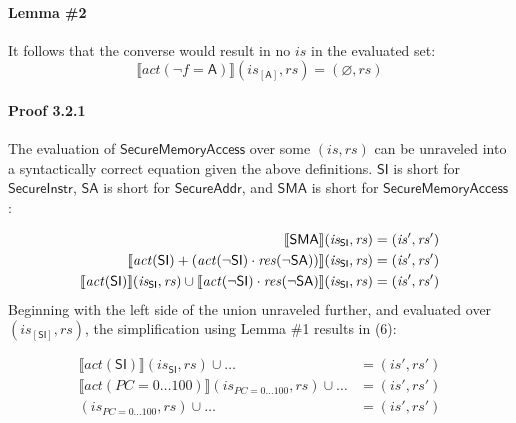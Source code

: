 \documentclass[12pt, letterpaper]{article}
\let\emptyset\varnothing
\newcommand\interp[1]{\llbracket #1 \rrbracket}
\begin{document}
 \paragraph{Lemma \#2}
     It follows that the converse would result in no $\mathit{is}$ in the evaluated set:
 \[
     \interp{ act(\neg f=\mathsf{A}) } (\mathit{is}_{[\mathsf{A}]}, \mathit{rs}) = (\emptyset, \mathit{rs})
 \]

 \paragraph{Proof 3.2.1}
     The evaluation of $\mathsf{SecureMemoryAccess}$ over some $(\mathit{is},\mathit{rs})$ can be unraveled into a syntactically correct equation given the above definitions.  $\mathsf{SI}$ is short for $\mathsf{SecureInstr}$, $\mathsf{SA}$ is short for $\mathsf{SecureAddr}$, and $\mathsf{SMA}$ is short for $\mathsf{SecureMemoryAccess}$:
 \par\nobreak
 {\small
 \begin{align}
     \setcounter{equation}{0}
     \interp{ \mathsf{SMA} } (\mathit{is_{\mathsf{SI}}}, \mathit{rs})
     &=
     (\mathit{is}', \mathit{rs}')
     \\
     \interp{ \mathit{act}(\mathsf{SI}) +
     (\mathit{act}(\neg\mathsf{SI}) \cdot
      \mathit{res}(\neg\mathsf{SA})) } (\mathit{is_{\mathsf{SI}}}, \mathit{rs})
     &=
     (\mathit{is}', \mathit{rs}')
     \\
     \interp{ \mathit{act}(\mathsf{SI}) } (\mathit{is_{\mathsf{SI}}}, \mathit{rs}) \cup %
     \interp{ \mathit{act}(\neg\mathsf{SI}) \cdot
      \mathit{res}(\neg\mathsf{SA}) } (\mathit{is_{\mathsf{SI}}}, \mathit{rs})
     &=
     (\mathit{is}', \mathit{rs}')
 \end{align}
 }
     Beginning with the left side of the union unraveled further, and evaluated over $(\mathit{is}_{[\mathsf{SI}]},\mathit{rs})$, the simplification using Lemma \#1 results in (6):
 \par\nobreak
 {\small
 \begin{align}
     \interp{ \mathit{act} (\mathsf{SI}) } (\mathit{is_{\mathsf{SI}}}, \mathit{rs}) \cup \ldots
     &=
     (\mathit{is}', \mathit{rs}')
     \\
     \interp{ \mathit{act} (PC=0\ldots 100) } (\mathit{is_{PC=0\ldots100}}, \mathit{rs}) \cup \ldots %
     &=
     (\mathit{is}', \mathit{rs}')
     \\
     (\mathit{is_{PC=0\ldots100}}, \mathit{rs}) \cup \ldots 
     &=
     (\mathit{is}', \mathit{rs}')
 \end{align}
 }
\end{document}
